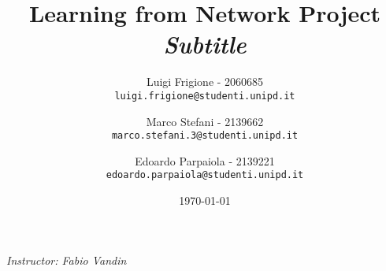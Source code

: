 \title{
    \textbf{Learning from Network Project}\\[.5cm]
    
    {\large\emph{Subtitle}}
}

\author{
  Luigi Frigione - 2060685\\
  \texttt{luigi.frigione@studenti.unipd.it}
  \and
  Marco Stefani - 2139662\\
  \texttt{marco.stefani.3@studenti.unipd.it}
  \and
  Edoardo Parpaiola - 2139221\\
  \texttt{edoardo.parpaiola@studenti.unipd.it}
}

\date{\today}

\maketitle

\vfill
{
    \emph{Instructor: Fabio Vandin}
}    

\blank